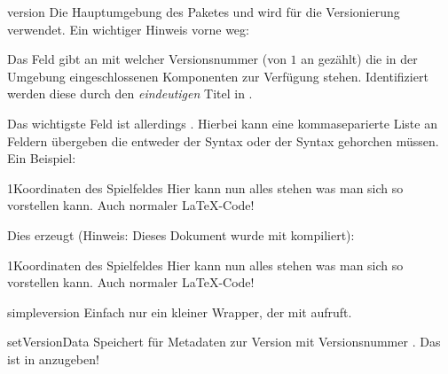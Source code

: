 \documentclass{sopra-base}
\begin{document}
\begin{environment}{version}{}
    Die Hauptumgebung des Paketes und wird für die Versionierung verwendet. Ein wichtiger Hinweis vorne weg: \par{}
    Das Feld  gibt an mit welcher Versionsnummer (von \(1\) an gezählt) die in der Umgebung eingeschlossenen Komponenten zur Verfügung stehen. Identifiziert werden diese durch den \emph{eindeutigen} Titel in .\par{}
    Das wichtigste Feld ist allerdings . Hierbei kann eine kommaseparierte Liste an Feldern übergeben die entweder der Syntax  oder der Syntax  gehorchen müssen. Ein Beispiel:
\begin{latex}
\begin{version}{1}{Koordinaten des Spielfeldes}
    Hier kann nun alles stehen was man sich so vorstellen kann. Auch normaler \LaTeX-Code!
\end{version}
\end{latex}
    Dies erzeugt (Hinweis: Dieses Dokument wurde mit  kompiliert):\\
\begin{version}{1}{Koordinaten des Spielfeldes}
Hier kann nun alles stehen was man sich so vorstellen kann. Auch normaler \LaTeX-Code!
\end{version}
\end{environment}

\begin{command}{simpleversion}{}
    Einfach nur ein kleiner Wrapper, der  mit  aufruft.
\end{command}

\begin{command}{setVersionData}{}
    Speichert für  Metadaten zur Version mit Versionsnummer . Das  ist in  anzugeben!
\end{command}
\end{document}
